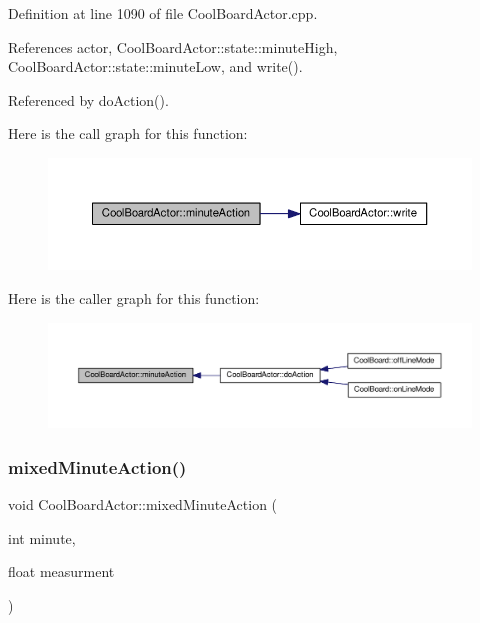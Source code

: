 Definition at line 1090 of file Cool\+Board\+Actor.\+cpp.



References actor, Cool\+Board\+Actor\+::state\+::minute\+High, Cool\+Board\+Actor\+::state\+::minute\+Low, and write().



Referenced by do\+Action().

Here is the call graph for this function\+:
\nopagebreak
\begin{figure}[H]
\begin{center}
\leavevmode
\includegraphics[width=350pt]{dc/d69/class_cool_board_actor_af000944ce0b9abb9c6ee4b8fe839fb36_cgraph}
\end{center}
\end{figure}
Here is the caller graph for this function\+:
\nopagebreak
\begin{figure}[H]
\begin{center}
\leavevmode
\includegraphics[width=350pt]{dc/d69/class_cool_board_actor_af000944ce0b9abb9c6ee4b8fe839fb36_icgraph}
\end{center}
\end{figure}
\mbox{\label{class_cool_board_actor_a2b8a79a27288d5246e3e3860ae76770d}} 
\subsubsection{\texorpdfstring{mixed\+Minute\+Action()}{mixedMinuteAction()}}
{\footnotesize\ttfamily void Cool\+Board\+Actor\+::mixed\+Minute\+Action (\begin{DoxyParamCaption}\item[{int}]{minute,  }\item[{float}]{measurment }\end{DoxyParamCaption})}

